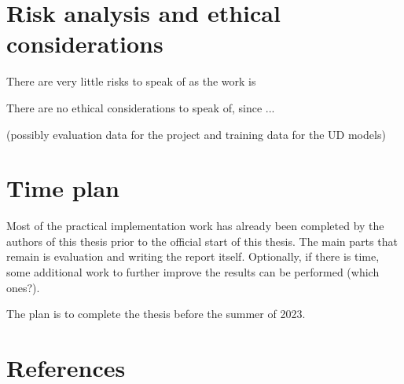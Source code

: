 \documentclass{article}
\begin{document}


\section{Risk analysis and ethical considerations}
There are very little risks to speak of as the work is

There are no ethical considerations to speak of, since ...

(possibly evaluation data for the project and training data for the UD models)

\section{Time plan}
Most of the practical implementation work has already been completed by the authors of this thesis prior to the official start of this thesis.
The main parts that remain is evaluation and writing the report itself. Optionally, if there is time, some additional work to further improve the results can be performed (which ones?).

The plan is to complete the thesis before the summer of 2023.





\section{References}






\end{document}
